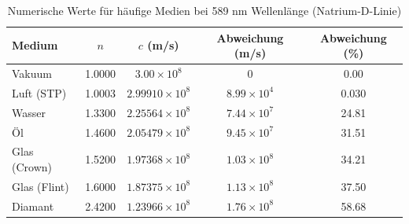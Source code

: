 \documentclass[a4paper,12pt]{article}
\theoremstyle{definition}
\theoremstyle{remark}
\newcommand{\cLight}{c}
\newcommand{\refIndex}{n}
\begin{document}
\begin{table}[H]
\centering
\small
\begin{tabular}{|l|c|c|c|c|}
\toprule
\textbf{Medium} & $\refIndex$ & $\cLight$ (m/s) & Abweichung (m/s) & Abweichung (\%) \\
\midrule
Vakuum & 1.0000 & $3.00 \times 10^8$ & 0 & 0.00 \\
Luft (STP) & 1.0003 & $2.99910 \times 10^8$ & $8.99 \times 10^4$ & 0.030 \\
Wasser & 1.3300 & $2.25564 \times 10^8$ & $7.44 \times 10^7$ & 24.81 \\
Öl & 1.4600 & $2.05479 \times 10^8$ & $9.45 \times 10^7$ & 31.51 \\
Glas (Crown) & 1.5200 & $1.97368 \times 10^8$ & $1.03 \times 10^8$ & 34.21 \\
Glas (Flint) & 1.6000 & $1.87375 \times 10^8$ & $1.13 \times 10^8$ & 37.50 \\
Diamant & 2.4200 & $1.23966 \times 10^8$ & $1.76 \times 10^8$ & 58.68 \\
\bottomrule
\end{tabular}
\caption{Numerische Werte für häufige Medien bei 589 nm Wellenlänge (Natrium-D-Linie)}
\end{table}
\end{document}

